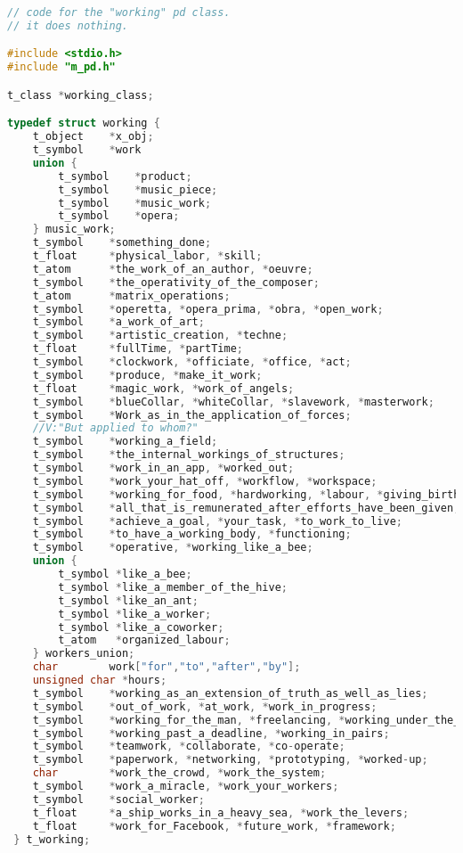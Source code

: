 \begin{flushleft}
\footnotesize
\begin{lstlisting}[caption={Pure Data working class},captionpos=b,language=C]
// code for the "working" pd class. 
// it does nothing.

#include <stdio.h>
#include "m_pd.h"

t_class *working_class;

typedef struct working {
	t_object 	*x_obj;
	t_symbol	*work
	union {
		t_symbol    *product;
		t_symbol 	*music_piece;
		t_symbol 	*music_work;
		t_symbol 	*opera;
	} music_work;
	t_symbol 	*something_done;
	t_float		*physical_labor, *skill;
	t_atom		*the_work_of_an_author, *oeuvre;
	t_symbol	*the_operativity_of_the_composer;
	t_atom		*matrix_operations;
	t_symbol	*operetta, *opera_prima, *obra, *open_work;
	t_symbol	*a_work_of_art;
	t_symbol	*artistic_creation, *techne;
	t_float		*fullTime, *partTime;
	t_symbol	*clockwork, *officiate, *office, *act;
	t_symbol	*produce, *make_it_work;
	t_float		*magic_work, *work_of_angels;
	t_symbol	*blueCollar, *whiteCollar, *slavework, *masterwork;
	t_symbol	*Work_as_in_the_application_of_forces;
	//V:"But applied to whom?"
	t_symbol	*working_a_field;
	t_symbol	*the_internal_workings_of_structures;
	t_symbol	*work_in_an_app, *worked_out;
	t_symbol	*work_your_hat_off, *workflow, *workspace;
	t_symbol	*working_for_food, *hardworking, *labour, *giving_birth;
	t_symbol	*all_that_is_remunerated_after_efforts_have_been_given;
	t_symbol	*achieve_a_goal, *your_task, *to_work_to_live;
	t_symbol	*to_have_a_working_body, *functioning;
	t_symbol	*operative, *working_like_a_bee;
	union {
		t_symbol *like_a_bee;
		t_symbol *like_a_member_of_the_hive;
		t_symbol *like_an_ant;
		t_symbol *like_a_worker;
		t_symbol *like_a_coworker;
		t_atom	 *organized_labour;
	} workers_union;
	char 		work["for","to","after","by"];
	unsigned char *hours;
	t_symbol	*working_as_an_extension_of_truth_as_well_as_lies;
	t_symbol	*out_of_work, *at_work, *work_in_progress;
	t_symbol	*working_for_the_man, *freelancing, *working_under_the_table;
	t_symbol	*working_past_a_deadline, *working_in_pairs;
	t_symbol	*teamwork, *collaborate, *co-operate;
	t_symbol	*paperwork, *networking, *prototyping, *worked-up;
	char		*work_the_crowd, *work_the_system;
	t_symbol	*work_a_miracle, *work_your_workers;
	t_symbol	*social_worker;
	t_float		*a_ship_works_in_a_heavy_sea, *work_the_levers;
	t_float		*work_for_Facebook, *future_work, *framework;
 } t_working;
\end{lstlisting}
\end{flushleft}
